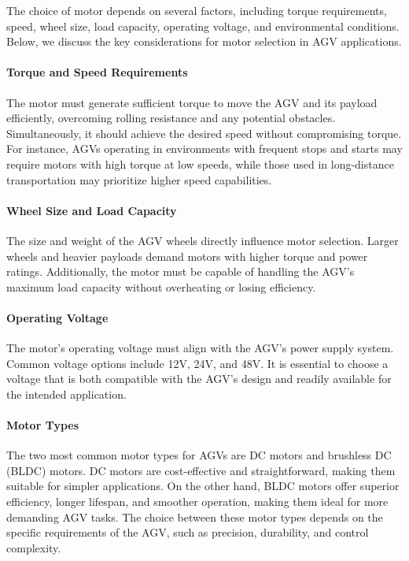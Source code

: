 \documentclass[../../main]{subfiles}
\begin{document}
The choice of motor depends on several factors, including torque requirements, speed, wheel size, load capacity, operating voltage, and environmental conditions. Below, we discuss the key considerations for motor selection in AGV applications.

\paragraph{Torque and Speed Requirements}
The motor must generate sufficient torque to move the AGV and its payload efficiently, overcoming rolling resistance and any potential obstacles. Simultaneously, it should achieve the desired speed without compromising torque. For instance, AGVs operating in environments with frequent stops and starts may require motors with high torque at low speeds, while those used in long-distance transportation may prioritize higher speed capabilities.

\paragraph{Wheel Size and Load Capacity}
The size and weight of the AGV wheels directly influence motor selection. Larger wheels and heavier payloads demand motors with higher torque and power ratings. Additionally, the motor must be capable of handling the AGV's maximum load capacity without overheating or losing efficiency.

\paragraph{Operating Voltage}
The motor's operating voltage must align with the AGV's power supply system. Common voltage options include 12V, 24V, and 48V. It is essential to choose a voltage that is both compatible with the AGV's design and readily available for the intended application.

\paragraph{Motor Types}
The two most common motor types for AGVs are DC motors and brushless DC (BLDC) motors. DC motors are cost-effective and straightforward, making them suitable for simpler applications. On the other hand, BLDC motors offer superior efficiency, longer lifespan, and smoother operation, making them ideal for more demanding AGV tasks. The choice between these motor types depends on the specific requirements of the AGV, such as precision, durability, and control complexity.
\end{document}
